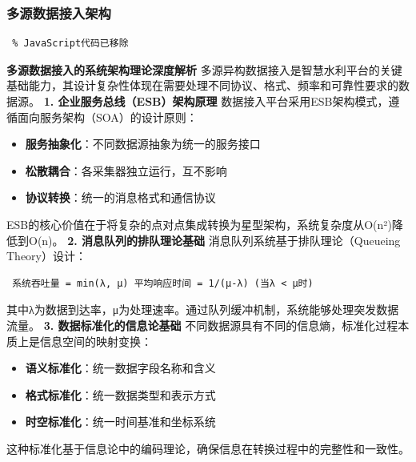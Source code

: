 \subsubsection{多源数据接入架构}\label{ux591aux6e90ux6570ux636eux63a5ux5165ux67b6ux6784} \begin{lstlisting} % JavaScript代码已移除
\end{lstlisting} \textbf{多源数据接入的系统架构理论深度解析} 多源异构数据接入是智慧水利平台的关键基础能力，其设计复杂性体现在需要处理不同协议、格式、频率和可靠性要求的数据源。 \textbf{1.
企业服务总线（ESB）架构原理} 数据接入平台采用ESB架构模式，遵循面向服务架构（SOA）的设计原则： \begin{itemize} \tightlist \item \textbf{服务抽象化}：不同数据源抽象为统一的服务接口
\item \textbf{松散耦合}：各采集器独立运行，互不影响 \item \textbf{协议转换}：统一的消息格式和通信协议 \end{itemize}
ESB的核心价值在于将复杂的点对点集成转换为星型架构，系统复杂度从O(n²)降低到O(n)。 \textbf{2. 消息队列的排队理论基础} 消息队列系统基于排队理论（Queueing Theory）设计：
\begin{lstlisting} 系统吞吐量 = min(λ, μ) 平均响应时间 = 1/(μ-λ) (当λ < μ时) \end{lstlisting} 其中λ为数据到达率，μ为处理速率。通过队列缓冲机制，系统能够处理突发数据流量。
\textbf{3. 数据标准化的信息论基础} 不同数据源具有不同的信息熵，标准化过程本质上是信息空间的映射变换： \begin{itemize} \tightlist \item \textbf{语义标准化}：统一数据字段名称和含义
\item \textbf{格式标准化}：统一数据类型和表示方式\\ \item \textbf{时空标准化}：统一时间基准和坐标系统 \end{itemize} 这种标准化基于信息论中的编码理论，确保信息在转换过程中的完整性和一致性。
